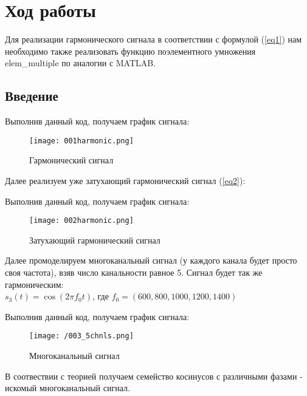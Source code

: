\section{Ход работы}
Для реализации гармонического сигнала в соответствии с формулой (\ref{eq1})
нам необходимо также реализовать функцию поэлементного умножения elem\_multiple по аналогии с MATLAB. 

\subsection{Введение}


\parindent=1cm %
Выполнив данный код, получаем график сигнала:
\begin{figure}[H]
	\begin{center}
		\texttt{[image: 001harmonic.png]}
		\caption{Гармонический сигнал} 
		\label{pic:pic01} %
	\end{center}
\end{figure}


\noindent Далее реализуем уже затухающий гармонический сигнал (\ref{eq2}):


\parindent=1cm %
\noindent  Выполнив данный код, получаем график сигнала:
\begin{figure}[H]
	\begin{center}
		\texttt{[image: 002harmonic.png]}
		\caption{Затухающий гармонический сигнал} 
		\label{pic:pic02} %
	\end{center}
\end{figure}

Далее промоделируем многоканальный сигнал (у каждого канала будет просто своя частота), взяв число канальности равное 5. Сигнал будет так же гармоническим: \\
$s_3(t) = \cos(2\pi f_0t)$, где $f_0= (600, 800, 1000, 1200, 1400)$ 


\parindent=1cm %
\noindent  Выполнив данный код, получаем график сигнала:
\begin{figure}[H]
	\begin{center}
		\texttt{[image: /003\_5chnls.png]}
		\caption{Многоканальный сигнал} 
		\label{pic:pic03} %
	\end{center}
\end{figure}
В соотвествии с теорией получаем семейство косинусов с различными фазами - искомый многоканальный сигнал.

